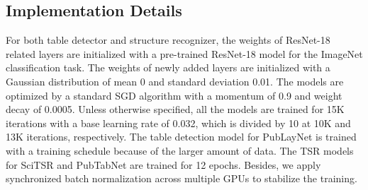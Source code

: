 \documentclass[final,3p,times,twocolumn]{elsarticle}
\begin{document}
\subsection{Implementation Details}
\label{subsec:details}
For both table detector and structure recognizer, the weights of ResNet-18 related layers are initialized with a pre-trained ResNet-18 model for the ImageNet classification task. The weights of newly added layers are initialized with a Gaussian distribution of mean 0 and standard deviation 0.01. The models are optimized by a standard SGD algorithm with a momentum of 0.9 and weight decay of 0.0005. Unless otherwise specified, all the models are trained for 15K iterations with a base learning rate of 0.032, which is divided by 10 at 10K and 13K iterations, respectively. The table detection model for PubLayNet is trained with a  training schedule because of the larger amount of data. The TSR models for SciTSR and PubTabNet are trained for 12 epochs. Besides, we apply synchronized batch normalization across multiple GPUs to stabilize the training.   
\end{document}
